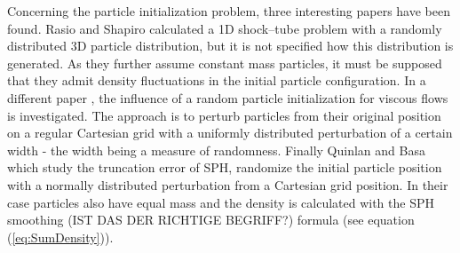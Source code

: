 \documentclass{report}
\begin{document}
 Concerning the particle initialization problem, three interesting papers have been found. Rasio and Shapiro \cite{Rasio1991} calculated a 1D shock--tube problem with a randomly distributed 3D particle distribution, but it is not specified how this distribution is generated. As they further assume constant mass particles, it must be supposed that they admit density fluctuations in the initial particle configuration.          
 In a different paper \cite{Graham2007}, the influence of a random particle initialization for viscous flows is investigated. The approach is to perturb particles from their original position on a regular Cartesian grid with a uniformly distributed perturbation of a certain width - the width being a measure of randomness.                                                                                                         
 Finally Quinlan and Basa \cite{Quinlan2006} which study the truncation error of SPH, randomize the initial particle position with a normally distributed perturbation from a Cartesian grid position. In their case particles also have equal mass and the density is calculated with the SPH smoothing (IST DAS DER RICHTIGE BEGRIFF?) formula (see equation (\ref{eq:SumDensity})).                                                       
                                                                                                                                              
\end{document}
